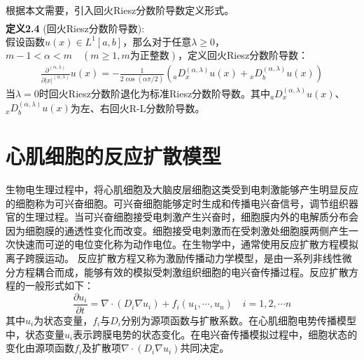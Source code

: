 \documentclass[twoside,UTF8]{nputhesis}
\newcommand{\upcite}[1]{\textsuperscript{\textsuperscript{\cite{#1}}}}
\begin{document}
根据本文需要，引入回火Riesz分数阶导数定义形式。\\
\textbf{定义2.4}
(回火Riesz分数阶导数)\upcite{邬小超2016回火反常运动粒子轨迹泛函分布的建模,ervin2006variational,roop2004variational,cartea2007fluid}:\\
假设函数$u(x)\in {{L}^{1}}[a,b]$，那么对于任意$\lambda \ge 0$，$m-1<\alpha <m \quad(m\ge 1,m\text{为正整数})$，定义回火Riesz分数阶导数：
\begin{equation}
\begin{split}
\frac{{{\partial }^{(\alpha ,\lambda )}}}{\partial {{\left| x \right|}^{(\alpha ,\lambda )}}}u(x)=-\frac{1}{2\cos (\alpha \pi /2)}({}_{a}D_{x}^{(\alpha ,\lambda )}u(x)+{}_{x}D_{b}^{(\alpha ,\lambda )}u(x))
\end{split}
\end{equation}
当$\lambda =0$时回火Riesz分数阶退化为标准Riesz分数阶导数。其中${}_{a}D_{x}^{(\alpha ,\lambda )}u(x)$、${}_{x}D_{b}^{(\alpha ,\lambda )}u(x)$为左、右回火R-L分数阶导数。

\section{心肌细胞的反应扩散模型}
生物电生理过程中，将心肌细胞及大脑皮层细胞这类受到电刺激能够产生明显反应的细胞称为可兴奋细胞。可兴奋细胞能够定时生成和传播电兴奋信号，调节组织器官的生理过程。当可兴奋细胞接受电刺激产生兴奋时，细胞膜内外的电解质分布会因为细胞膜的通透性变化而改变。细胞接受电刺激而在受刺激处细胞膜两侧产生一次快速而可逆的电位变化称为动作电位。在生物学中，通常使用反应扩散方程模拟离子跨膜运动。
反应扩散方程又称为激励传播动力学模型，是由一系列非线性微分方程耦合而成，能够有效的模拟受刺激组织细胞的电兴奋传播过程。反应扩散方程的一般形式如下：
\begin{equation}
\frac{\partial u_{i}}{\partial t}=\nabla \cdot\left(D_{i} \nabla u_{i}\right)+f_{i}\left(u_{1}, \cdots, u_{n}\right) \quad i=1,2, \cdots n
\end{equation}
其中$u_{i}$为状态变量，$f_{i}$与$D_{i}$分别为源项函数与扩散系数。在心肌细胞电势传播模型中，状态变量$u_{i}$表示跨膜电势的状态变化。在电兴奋传播模拟过程中，细胞状态的变化由源项函数$f_{i}$及扩散项$\nabla \cdot\left(D_{i} \nabla u_{i}\right)$共同决定。
\end{document}
